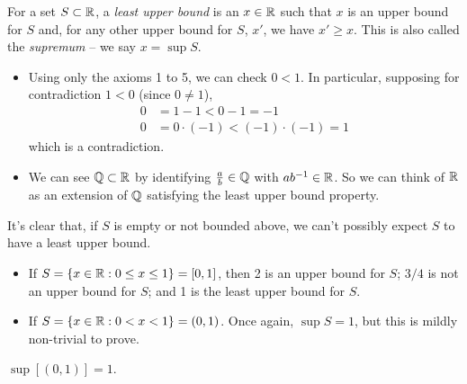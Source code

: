 \documentclass{../../template/note}
\begin{document}
    \begin{definition}
        For a set \(S \subset \mathbb R\), a \emph{least upper bound} is an \(x \in \mathbb R\) such that \(x\) is an upper bound for \(S\) and, for any other upper bound for \(S\), \(x'\), we have \(x' \geq x\). This is also called the \emph{supremum} -- we say \(x = \sup S\).
    \end{definition}
    
    \begin{remark*}
        \begin{itemize}
            \item Using only the axioms 1 to 5, we can check \(0 < 1\). In particular, supposing for contradiction \(1 < 0\) (since \(0 \neq 1\)),
            \begin{align*}
                0 &= 1 - 1 < 0 - 1 = -1 \\
                0 &= 0 \cdot (-1) < (-1) \cdot (-1) = 1
            \end{align*}
            which is a contradiction.
            \item We can see \(\mathbb Q \subset \mathbb R\) by identifying \(\frac{a}{b} \in \mathbb Q\) with \(ab^{-1} \in \mathbb R\). So we can think of \(\mathbb R\) as an extension of \(\mathbb Q\) satisfying the least upper bound property.
        \end{itemize}
    \end{remark*}
    
    \begin{remark*}
        It's clear that, if \(S\) is empty or not bounded above, we can't possibly expect \(S\) to have a least upper bound.
    \end{remark*}
    


    \begin{example}
        \begin{itemize}
            \item If \(S = \{x \in \mathbb R: 0 \leq x \leq 1\} = [0, 1]\), then 2 is an upper bound for \(S\); \(3/4\) is not an upper bound for \(S\); and 1 is the least upper bound for \(S\).
            \item If \(S = \{x \in \mathbb R: 0 < x < 1\} = (0, 1)\). Once again, \(\sup S = 1\), but this is mildly non-trivial to prove.
        \end{itemize}
    \end{example}
    
    \begin{proposition}
        \(\sup[(0, 1)] = 1\).
    \end{proposition}
    
\end{document}
